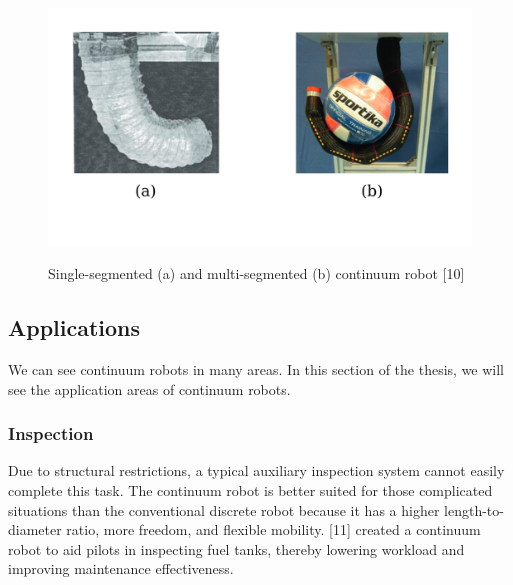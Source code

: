 \documentclass[12pt,twoside,a4]{mwbk}
\begin{document}
\begin{figure}[h]
    \centering
    \includegraphics[width=14.25cm, height=7cm]{single-multi.png}
    \caption{Single-segmented (a) and multi-segmented (b) continuum robot [10]}
\end{figure}

\subsection{Applications}
We can see continuum robots in many areas. In this section of the thesis, we will see the application areas of continuum robots.

\subsubsection{Inspection}
Due to structural restrictions, a typical auxiliary inspection system cannot easily complete this task. The continuum robot is better suited for those complicated situations than the conventional discrete robot because it has a higher length-to-diameter ratio, more freedom, and flexible mobility. [11] created a continuum robot to aid pilots in inspecting fuel tanks, thereby lowering workload and improving maintenance effectiveness.
\end{document}
